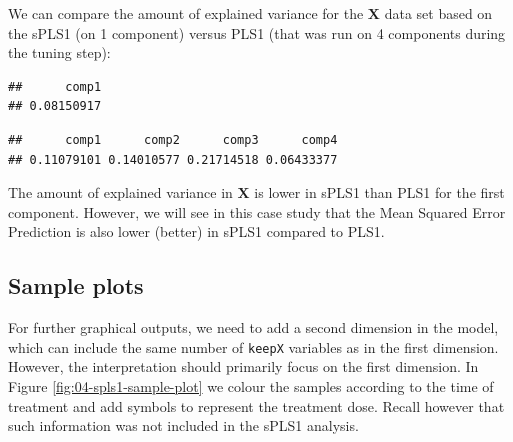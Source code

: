 \documentclass[
]{book}
\newenvironment{Shaded}{\begin{snugshade}}{\end{snugshade}}
\newcommand{\NormalTok}[1]{#1}
\newcommand{\SpecialCharTok}[1]{\textcolor[rgb]{0.00,0.00,0.00}{#1}}
\begin{document}
We can compare the amount of explained variance for the \(\boldsymbol X\) data set based on the sPLS1 (on 1 component) versus PLS1 (that was run on 4 components during the tuning step):

\begin{Shaded}
\end{Shaded}

\begin{verbatim}
##      comp1 
## 0.08150917
\end{verbatim}

\begin{Shaded}
\end{Shaded}

\begin{verbatim}
##      comp1      comp2      comp3      comp4 
## 0.11079101 0.14010577 0.21714518 0.06433377
\end{verbatim}

The amount of explained variance in \(\boldsymbol X\) is lower in sPLS1 than PLS1 for the first component. However, we will see in this case study that the Mean Squared Error Prediction is also lower (better) in sPLS1 compared to PLS1.

\hypertarget{04:spls1-sample-plots}{%
\subsection{Sample plots}\label{04:spls1-sample-plots}}

For further graphical outputs, we need to add a second dimension in the model, which can include the same number of \texttt{keepX} variables as in the first dimension. However, the interpretation should primarily focus on the first dimension. In Figure \ref{fig:04-spls1-sample-plot} we colour the samples according to the time of treatment and add symbols to represent the treatment dose. Recall however that such information was not included in the sPLS1 analysis.
\end{document}

